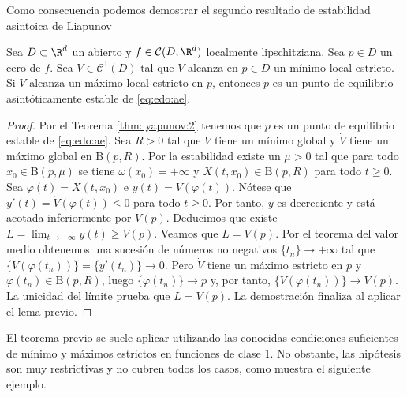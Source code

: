 Como consecuencia podemos demostrar el segundo resultado de estabilidad asintoica de Liapunov
\begin{theorem}
  \label{thm:lyapunov:3}
  Sea $D \subset \R^d$ un abierto y $f \in \mathcal{C}(D, \R^d)$ localmente lipschitziana. Sea
  $p \in D$ un cero de $f$.  Sea $V \in \mathcal{C}^1(D)$ tal que $V$ alcanza en $p \in D$ un mínimo
  local estricto. Si $\dot{V}$ alcanza un máximo local estricto en $p$, entonces $p$ es un punto de
  equilibrio asintóticamente estable de \eqref{eq:edo:ae}.
\end{theorem}
\begin{proof}
  Por el Teorema \ref{thm:lyapunov:2} tenemos que $p$ es un punto de equilibrio estable de
  \eqref{eq:edo:ae}. Sea $R > 0$ tal que $V$ tiene un mínimo global y $\dot{V}$ tiene un máximo
  global en $\mathrm{B}(p, R)$. Por la estabilidad existe un $\mu > 0$ tal que para todo
  $x_0 \in \mathrm{B}(p,\mu)$ se tiene $\omega(x_0) = +\infty$ y $X(t, x_0) \in \mathrm{B}(p, R)$
  para todo $t \ge 0$. Sea $\varphi(t) = X(t, x_0)$ e $y(t) = V(\varphi(t))$. Nótese que
  $y'(t) = \dot{V}(\varphi(t)) \le 0$ para todo $t \ge 0$. Por tanto, $y$ es decreciente y está
  acotada inferiormente por $V(p)$. Deducimos que existe $L = \lim_{t \to +\infty} y(t) \ge
  V(p)$. Veamos que $L = V(p)$. Por el teorema del valor medio obtenemos una sucesión de números no
  negativos $\{t_n\}\to+\infty$ tal que $\{\dot{V}(\varphi(t_n))\} = \{y'(t_n)\}\to 0$. Pero
  $\dot{V}$ tiene un máximo estricto en $p$ y $\varphi(t_n) \in \mathrm{B}(p, R)$, luego
  $\{\varphi(t_n)\} \to p$ y, por tanto, $\{V(\varphi(t_n))\} \to V(p)$. La unicidad del límite
  prueba que $L = V(p)$. La demostración finaliza al aplicar el lema previo.
\end{proof}

El teorema previo se suele aplicar utilizando las conocidas condiciones suficientes de mínimo y
máximos estrictos en funciones de clase 1. No obstante, las hipótesis son muy restrictivas y no
cubren todos los casos, como muestra el siguiente ejemplo.

